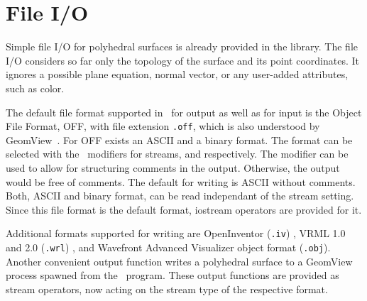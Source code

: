 

\section{File I/O}
\label{sectionPolyIO}

Simple file I/O for polyhedral surfaces is already provided in the
library. The file I/O considers so far only the topology of the
surface and its point coordinates. It ignores a possible plane
equation, normal vector, or any user-added attributes, such as color.

The default file format supported in \cgal\ for output as well as for
input is the Object File Format, OFF, with file extension {\tt .off},
which is also understood by GeomView~\cite{p-gmgv15-94}. For OFF
exists an ASCII and a binary format. The format can be selected with
the \cgal\ modifiers for streams,  and
 respectively. The modifier 
can be used to allow for structuring comments in the
output. Otherwise, the output would be free of comments.  The default
for writing is ASCII without comments. Both, ASCII and binary format,
can be read independant of the stream setting. Since this file format
is the default format, iostream operators are provided for it.


\ccHtmlNoLinks
{}

\ccHtmlNoLinks
{}


Additional formats supported for writing are OpenInventor ({\tt .iv})
\cite{w-impoo-94}, VRML 1.0 and 2.0 ({\tt .wrl})
\cite{bpp-vrml-95,vrmls-96,hw-vrml2h-96}, and Wavefront Advanced
Visualizer object format ({\tt .obj}). Another convenient output
function writes a polyhedral surface to a GeomView process spawned
from the \cgal\ program.  These output functions are provided as
stream operators, now acting on the stream type of the respective
format.

\\
\\
\\

